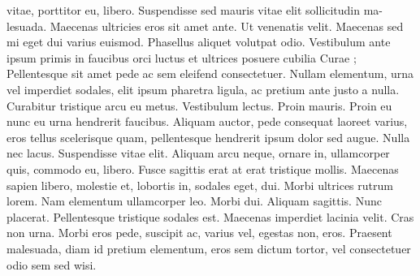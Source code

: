 vitae, porttitor eu, libero. Suspendisse sed mauris vitae elit sollicitudin ma-
lesuada. Maecenas ultricies eros sit amet ante. Ut venenatis velit. Maecenas
sed mi eget dui varius euismod. Phasellus aliquet volutpat odio. Vestibulum
ante ipsum primis in faucibus orci luctus et ultrices posuere cubilia Curae ;
Pellentesque sit amet pede ac sem eleifend consectetuer. Nullam elementum,
urna vel imperdiet sodales, elit ipsum pharetra ligula, ac pretium ante justo
a nulla. Curabitur tristique arcu eu metus. Vestibulum lectus. Proin mauris.
Proin eu nunc eu urna hendrerit faucibus. Aliquam auctor, pede consequat
laoreet varius, eros tellus scelerisque quam, pellentesque hendrerit ipsum
dolor sed augue. Nulla nec lacus.
Suspendisse vitae elit. Aliquam arcu neque, ornare in, ullamcorper quis,
commodo eu, libero. Fusce sagittis erat at erat tristique mollis. Maecenas
sapien libero, molestie et, lobortis in, sodales eget, dui. Morbi ultrices rutrum
lorem. Nam elementum ullamcorper leo. Morbi dui. Aliquam sagittis. Nunc
placerat. Pellentesque tristique sodales est. Maecenas imperdiet lacinia velit.
Cras non urna. Morbi eros pede, suscipit ac, varius vel, egestas non, eros.
Praesent malesuada, diam id pretium elementum, eros sem dictum tortor,
vel consectetuer odio sem sed wisi.